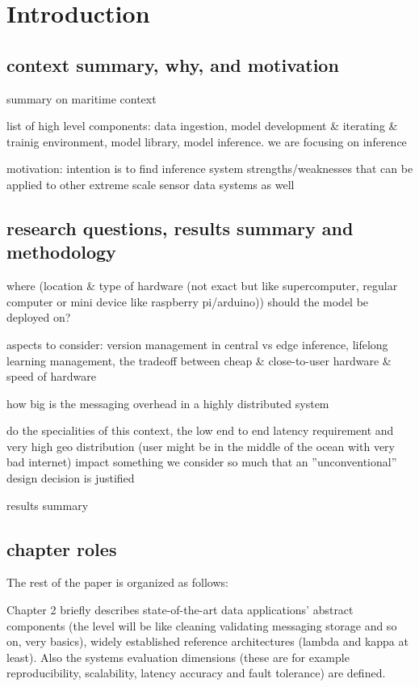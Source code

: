 \chapter{Introduction}

\section{context summary, why, and motivation}
summary on maritime context

list of high level components: data ingestion, model development & iterating & trainig environment, model library, model inference. we are focusing on inference

motivation: intention is to find inference system strengths/weaknesses that can be applied to other extreme scale sensor data systems as well

\section{research questions, results summary and methodology}

where (location & type of hardware (not exact but like supercomputer, regular computer or mini device like raspberry pi/arduino)) should the model be deployed on?

aspects to consider: version management in central vs edge inference, lifelong learning management, the tradeoff between cheap & close-to-user hardware & speed of hardware 

how big is the messaging overhead in a highly distributed system

do the specialities of this context, the low end to end latency requirement and very high geo distribution (user might be in the middle of the ocean with very bad internet) impact something we consider so much that an ''unconventional'' design decision is justified

results summary

\section{chapter roles}
The rest of the paper is organized as follows: 

Chapter 2 briefly describes state-of-the-art data applications' abstract components (the level will be like cleaning validating messaging storage and so on, very basics), widely established reference architectures (lambda and kappa at least). Also the systems evaluation dimensions (these are for example reproducibility, scalability, latency accuracy and fault tolerance) are defined. 

